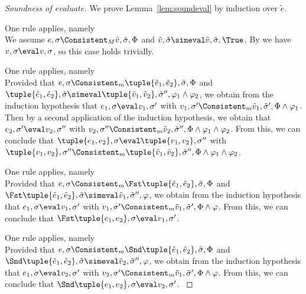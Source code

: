 \begin{proof}[Soundness of evaluate]

  We prove Lemma~\ref{lem:soundeval} by induction over $\tilde{e}$.

    {One rule applies, namely \\
    We assume $e,\sigma\Consistent_M\tilde{v},\tilde{\sigma},\Phi$ and $\tilde{v},\tilde{\sigma}\simeval\tilde{v},\tilde{\sigma},\True$.
    By  we have $v,\sigma\eval v,\sigma$, so this case holds trivially.
    }

    {One rule applies, namely \\
    Provided that $e,\sigma\Consistent_m\tuple{\tilde{e}_1,\tilde{e}_2},\tilde{\sigma},\Phi$ and $\tuple{\tilde{e}_1,\tilde{e}_2},\tilde{\sigma}\simeval\tuple{\tilde{v}_1,\tilde{v}_2},\tilde{\sigma}'',\phi_1\land\phi_2$,
    we obtain from the induction hypothesis that $e_1,\sigma\eval v_1,\sigma'$ with $v_1,\sigma'\Consistent_m\tilde{v}_1,\tilde{\sigma}',\Phi\land\phi_1$.
    Then by a second application of the induction hypothesis, we obtain that $e_2,\sigma'\eval v_2,\sigma''$ with $v_2,\sigma''\Consistent_m\tilde{v}_2,\tilde{\sigma}'',\Phi\land\phi_1\land\phi_2$.
    From this, we can conclude that $\tuple{e_1,e_2},\sigma\eval\tuple{v_1,v_2},\sigma''$ with $\tuple{v_1,v_2},\sigma''\Consistent_m\tuple{\tilde{v}_1,\tilde{v}_2},\tilde{\sigma}'',\Phi\land\phi_1\land\phi_2$.
    }

  {
    One rule applies, namely \\
    Provided that $e,\sigma\Consistent_m\Fst\tuple{\tilde{e}_1,\tilde{e}_2},\tilde{\sigma},\Phi$ and $\Fst\tuple{\tilde{e}_1,\tilde{e}_2},\tilde{\sigma}\simeval\tilde{v}_1,\tilde{\sigma}'',\phi$,
    we obtain from the induction hypothesis that $e_1,\sigma\eval v_1,\sigma'$ with $v_1,\sigma'\Consistent_m\tilde{v}_1,\tilde{\sigma}',\Phi\land\phi$.
    From this, we can conclude that $\Fst\tuple{e_1,e_2},\sigma\eval v_1,\sigma'$.
    }

  { One rule applies, namely \\
  Provided that $e,\sigma\Consistent_m\Snd\tuple{\tilde{e}_1,\tilde{e}_2},\tilde{\sigma},\Phi$ and $\Snd\tuple{\tilde{e}_1,\tilde{e}_2},\tilde{\sigma}\simeval\tilde{v}_2,\tilde{\sigma}'',\phi$,
  we obtain from the induction hypothesis that $e_1,\sigma\eval v_2,\sigma'$ with $v_2,\sigma'\Consistent_m\tilde{v}_1,\tilde{\sigma}',\Phi\land\phi$.
  From this, we can conclude that $\Snd\tuple{e_1,e_2},\sigma\eval v_2,\sigma'$.
    }


\end{proof}

